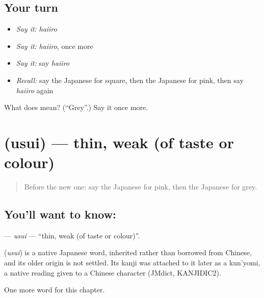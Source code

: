 \subsection*{Your turn}
\begin{itemize}
\raggedright
  \item \emph{Say it:} \emph{haiiro}
  \item \emph{Say it:} \emph{haiiro}, once more
  \item \emph{Say it:} say \emph{haiiro}
  \item \emph{Recall:} say the Japanese for square, then the Japanese for pink, then say \emph{haiiro} again
\end{itemize}

\begin{tcolorbox}[breakable,colback=teal!4,colframe=teal!35!black,title={Before you move on}]
What does  mean? (\textquotedblleft{}Grey\textquotedblright{}.) Say it once more.
\end{tcolorbox}
\section[\texorpdfstring{\ja{うすい} (usui)}{うすい (usui)}]{ (usui) — thin, weak (of taste or colour)}

\label{lesson:JA-C121-usui}



\begin{quote}
Before the new one: say the Japanese for pink, then the Japanese for grey.
\end{quote}

\subsection*{You'll want to know: }
\textbf{} — \emph{usui} — \textquotedblleft{}thin, weak (of taste or colour)\textquotedblright{}.

\begin{cousinweb}
\textbf{} (\emph{usui}) is a native Japanese word, inherited rather than borrowed from Chinese, and its older origin is not settled. Its kanji was attached to it later as a kun'yomi, a native reading given to a Chinese character (JMdict, KANJIDIC2).
\end{cousinweb}

\begin{grammarlens}[title={What you've built}]
One more word for this chapter.
\end{grammarlens}

